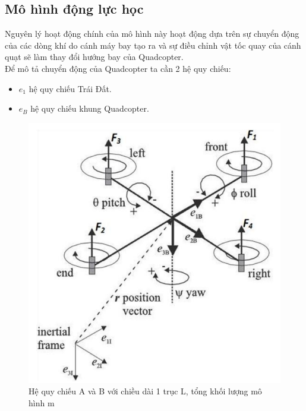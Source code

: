         \subsection{Mô hình động lực học}
        Nguyên lý hoạt động chính của mô hình này hoạt động dựa trên sự chuyển động của các dòng khí do cánh máy bay tạo ra và sự điều chỉnh vật tốc quay của cánh quạt sẽ làm thay đổi hướng bay của Quadcopter. \\
        Để mô tả chuyển động của Quadcopter ta cần 2 hệ quy chiếu:
        \begin{itemize}
        \item $e_1$ hệ quy chiếu Trái Đất.
        \item $e_B$ hệ quy chiếu khung Quadcopter.
        \end{itemize}
        \begin{figure}[h!]
        
	        	\begin{center}
	        	
	        		\includegraphics[scale=0.4]{images/Cuong-reference.png}
	        		\caption{Hệ quy chiếu A và B với chiều dài 1 trục L, tổng khối lượng mô hình m}
	        		
	        	\end{center}
        \end{figure}
